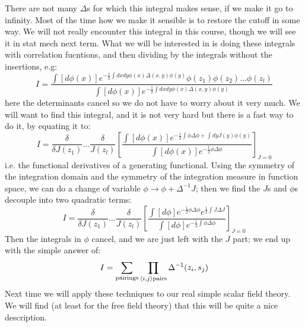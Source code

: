 There are not many $\Delta$s for which this integral makes sense, if we make it go to infinity. Most of the time how we make it sensible is to restore the cutoff in some way. We will not really encounter this integral in this course, though we will see it in stat mech next term. What we will be interested in is doing these integrals with correlation fucntions, and then dividing by the integrals without the insertions, e.g:
\begin{equation}
    I = \frac{\int [d\phi(x)] e^{-\frac{1}{2}\int dxdy\phi(x)\Delta(x, y)\phi(y)}\phi(z_1)\phi(z_2)\ldots \phi(z_l)}{\int [d\phi(x)] e^{-\frac{1}{2}\int dxdy\phi(x)\Delta(x, y)\phi(y)}}
\end{equation}
here the determinants cancel so we do not have to worry about it very much. We will want to find this integral, and it is not very hard but there is a fast way to do it, by equating it to:
\begin{equation}
    I = \frac{\delta}{\delta J(z_1)} \ldots \frac{\delta}{J(z_l)}\left[\frac{\int [d\phi(x)]e^{-\frac{1}{2}\int \phi\Delta\phi + \int dyJ(y)\phi(y)}}{\int [d\phi(x)]e^{-\frac{1}{2}\phi \Delta \phi}}\right]_{J = 0}
\end{equation}
i.e. the functional derivatives of a generating functional. Using the symmetry of the integration domain and the symmetry of the integration measure in function space, we can do a change of variable $\phi \to \phi + \Delta^{-1}J$; then we find the $J$s and $\phi$s decouple into two quadratic terms:
\begin{equation}
    I = \frac{\delta}{\delta J(z_1)} \ldots \frac{\delta}{J(z_l)}\left[\frac{\int [d\phi]e^{-\frac{1}{2}\phi\Delta \phi}e^{\frac{1}{2}\int J \Delta J}}{\int [d\phi] e^{-\frac{1}{2}\int \phi \Delta \phi}}\right]_{J=0}
\end{equation}
Then the integrals in $\phi$ cancel, and we are just left with the $J$ part; we end up with the simple answer of:
\begin{equation}
    I = \sum_{\text{pairings}}\prod_{\left< i,j \right> \text{pairs}}\Delta^{-1}(z_i, s_j)
\end{equation}
Next time we will apply these techniques to our real simple scalar field theory. We will find (at least for the free field theory) that this will be quite a nice description.